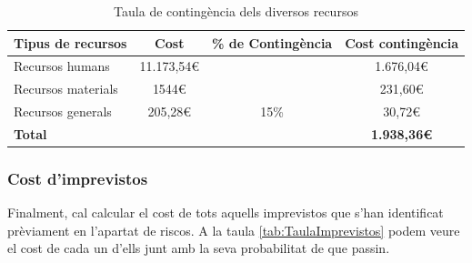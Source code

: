 \documentclass[a4paper]{article}
\begin{document}
\begin{table}[H]
    \begin{center}
        \begin{tabular}{|l|c|c|c|}
            \hline
            \rowcolor[HTML]{9B9B9B} 
            {\color[HTML]{000000} \textbf{Tipus de recursos}} & {\color[HTML]{000000} \textbf{Cost}} & {\color[HTML]{000000} \textbf{\% de Contingència}} & {\color[HTML]{000000} \textbf{Cost contingència}} \\ \hline
            {\color[HTML]{000000} Recursos humans}            & {\color[HTML]{000000} 11.173,54€}    & {\color[HTML]{000000} }                            & {\color[HTML]{000000} 1.676,04€}                  \\ \cline{1-2} \cline{4-4} 
            {\color[HTML]{000000} Recursos materials}         & {\color[HTML]{000000} 1544€}          & {\color[HTML]{000000} }                            & {\color[HTML]{000000} 231,60€}                    \\ \cline{1-2} \cline{4-4} 
            {\color[HTML]{000000} Recursos generals}          & {\color[HTML]{000000} 205,28€}       & \multirow{-3}{*}{{\color[HTML]{000000} 15\%}}      & {\color[HTML]{000000} 30,72€}                     \\ \hline
            \rowcolor[HTML]{C0C0C0} 
            {\color[HTML]{000000} \textbf{Total}}             & {\color[HTML]{000000} \textbf{}}     & {\color[HTML]{000000} \textbf{}}                   & {\color[HTML]{000000} \textbf{1.938,36€}}         \\ \hline
        \end{tabular}
        \caption{Taula de contingència dels diversos recursos}
        \label{tab:TaulaContingència}
    \end{center}
\end{table}

\subsubsection{Cost d'imprevistos}
Finalment, cal calcular el cost de tots aquells imprevistos que s'han identificat prèviament en l'apartat de riscos. A la taula \ref{tab:TaulaImprevistos} podem veure el cost de cada un d'ells junt amb la seva probabilitat de que passin.
\end{document}
